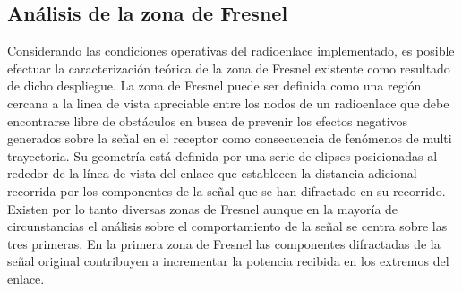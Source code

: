 \documentclass[conference]{IEEEtran}
\begin{document}
\subsection{Análisis de la zona de Fresnel}
Considerando las condiciones operativas del radioenlace implementado, es posible efectuar la caracterización teórica de la 
zona de Fresnel existente como resultado de dicho despliegue. La zona de Fresnel puede ser definida como una región cercana a la 
linea de vista apreciable entre los nodos de un radioenlace que debe encontrarse libre de obstáculos en busca de prevenir los efectos negativos
generados sobre la señal en el receptor como consecuencia de fenómenos de multi trayectoria. Su geometría está definida por una serie de elipses 
posicionadas al rededor de la línea de vista del enlace que establecen la distancia adicional recorrida por los componentes de la señal
que se han difractado en su recorrido. Existen por lo tanto diversas zonas de Fresnel aunque en la mayoría de circunstancias el análisis 
sobre el comportamiento de la señal se centra sobre las tres primeras.  En la primera zona de Fresnel las componentes difractadas de la señal
original contribuyen a incrementar la potencia recibida en los extremos del enlace. 
\end{document}
